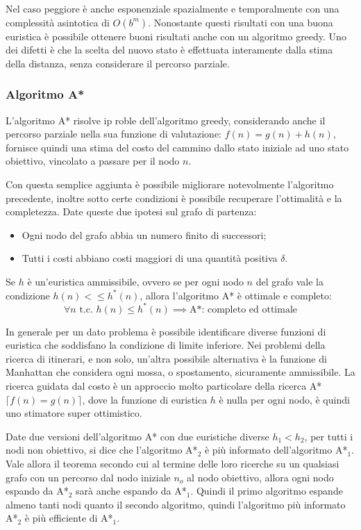 \documentclass{article}
\numberwithin{equation}{subsection}
\begin{document}
Nel caso peggiore è anche esponenziale spazialmente e temporalmente con una complessità asintotica di $O(b^m)$. Nonostante questi risultati con una buona euristica è 
possibile ottenere buoni risultati anche con un algoritmo greedy. 
Uno dei difetti è che la scelta del nuovo stato è effettuata interamente dalla stima della distanza, senza considerare il percorso parziale. 

\subsubsection{Algoritmo A*}


L'algoritmo A* risolve ip roble dell'algoritmo greedy, considerando anche il percorso parziale nella sua funzione di valutazione: $f(n)=g(n)+h(n)$, fornisce 
quindi una stima del costo del cammino dallo stato iniziale ad uno stato obiettivo, vincolato a passare per il nodo $n$. 

Con questa semplice aggiunta è possibile migliorare notevolmente l'algoritmo precedente, inoltre sotto certe condizioni è possibile recuperare l'ottimalità e la 
completezza. Date queste due ipotesi sul grafo di partenza:
\begin{itemize}
    \item Ogni nodo del grafo abbia un numero finito di successori;
    \item Tutti i costi abbiano costi maggiori di una quantità positiva $\delta$. 
\end{itemize}

Se $h$ è un'euristica ammissibile, ovvero se per ogni nodo $n$ del grafo vale la condizione $h(n)<\leq h^*(n)$, allora l'algoritmo A* è ottimale e completo:
\begin{equation}
    \forall n\mbox{ t.c. }h(n)\leq h^*(n)\implies \text{A*: completo ed ottimale}
\end{equation}

In generale per un dato problema è possibile identificare diverse funzioni di euristica che soddisfano la condizione di limite inferiore. Nei problemi della ricerca 
di itinerari, e non solo, un'altra possibile alternativa è la funzione di Manhattan che considera ogni mossa, o spostamento, sicuramente ammissibile. La ricerca 
guidata dal costo è un approccio molto particolare della ricerca A* $\lceil f(n)=g(n)\rceil$, dove la funzione di euristica $h$ è nulla per ogni nodo, è quindi uno stimatore 
super ottimistico. 

Date due versioni dell'algoritmo A* con due euristiche diverse $h_1<h_2$, per tutti i nodi non obiettivo, si dice che l'algoritmo A*$_2$ è più informato dell'algoritmo 
A*$_1$. 
Vale allora il teorema secondo cui al termine delle loro ricerche su un qualsiasi grafo con un percorso dal nodo iniziale $n_o$ al nodo obiettivo, allora ogni nodo 
espando da A*$_2$ sarà anche espando da A*$_1$. Quindi il primo algoritmo espande almeno tanti nodi quanto il secondo algoritmo, quindi l'algoritmo più informato A*$_2$ 
è più efficiente di A*$_1$. 
\end{document}
